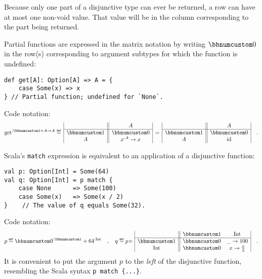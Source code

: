 Because only one part of a disjunctive type can ever be returned,
a row can have at most one non-void value. That value will be in the
column corresponding to the part being returned. 

Partial functions are expressed in the matrix notation by writing
$\bbnum 0$ in the row(s) corresponding to argument subtypes for which
the function is undefined:
\begin{lstlisting}
def get[A]: Option[A] => A = {
    case Some(x) => x
} // Partial function; undefined for `None`.
\end{lstlisting}
Code notation:
\[
\text{get}^{:\bbnum 1+A\rightarrow A}\triangleq\,\begin{array}{|c||c|}
 & A\\
\hline \bbnum 1 & \bbnum 0\\
A & x^{:A}\rightarrow x
\end{array}\,=\,\begin{array}{|c||c|}
 & A\\
\hline \bbnum 1 & \bbnum 0\\
A & \text{id}
\end{array}\quad.
\]

Scala\textsf{'}s \lstinline!match! expression is equivalent to an application
of a disjunctive function:
\begin{lstlisting}
val p: Option[Int] = Some(64)
val q: Option[Int] = p match {
    case None      => Some(100)
    case Some(x)   => Some(x / 2)
}    // The value of q equals Some(32).
\end{lstlisting}
Code notation:
\[
p\triangleq\bbnum 0^{:\bbnum 1}+64^{:\text{Int}}\quad,\quad q\triangleq p\triangleright\,\begin{array}{|c||cc|}
 & \bbnum 1 & \text{Int}\\
\hline \bbnum 1 & \bbnum 0 & \_\rightarrow100\\
\text{Int} & \bbnum 0 & x\rightarrow\frac{x}{2}
\end{array}\quad.
\]
It is convenient to put the argument $p$ to the \emph{left} of the
disjunctive function, resembling the Scala syntax \lstinline!p match {...}!.

